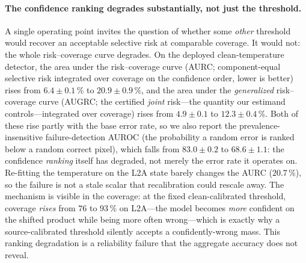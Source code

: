 \documentclass[preprint,3p,times]{elsarticle}
\begin{document}
\paragraph{The confidence ranking degrades substantially, not just the threshold.} A single operating point invites the question of whether some \emph{other} threshold would recover an acceptable selective risk at comparable coverage. It would not: the whole risk--coverage curve degrades. On the deployed clean-temperature detector, the area under the risk--coverage curve (AURC; component-equal selective risk integrated over coverage on the confidence order, lower is better) rises from $6.4 \pm 0.1\,\%$ to $20.9 \pm 0.9\,\%$, and the area under the \emph{generalized} risk--coverage curve (AUGRC; the certified \emph{joint} risk---the quantity our estimand controls---integrated over coverage) rises from $4.9 \pm 0.1$ to $12.3 \pm 0.4\,\%$. Both of these rise partly with the base error rate, so we also report the prevalence-insensitive failure-detection AUROC (the probability a random error is ranked below a random correct pixel), which falls from $83.0 \pm 0.2$ to $68.6 \pm 1.1$: the confidence \emph{ranking} itself has degraded, not merely the error rate it operates on. Re-fitting the temperature on the L2A state barely changes the AURC ($20.7\,\%$), so the failure is not a stale scalar that recalibration could rescale away. The mechanism is visible in the coverage: at the fixed clean-calibrated threshold, coverage \emph{rises} from $76$ to $93\,\%$ on L2A---the model becomes \emph{more} confident on the shifted product while being more often wrong---which is exactly why a source-calibrated threshold silently accepts a confidently-wrong mass. This ranking degradation is a reliability failure that the aggregate accuracy does not reveal.
\end{document}
